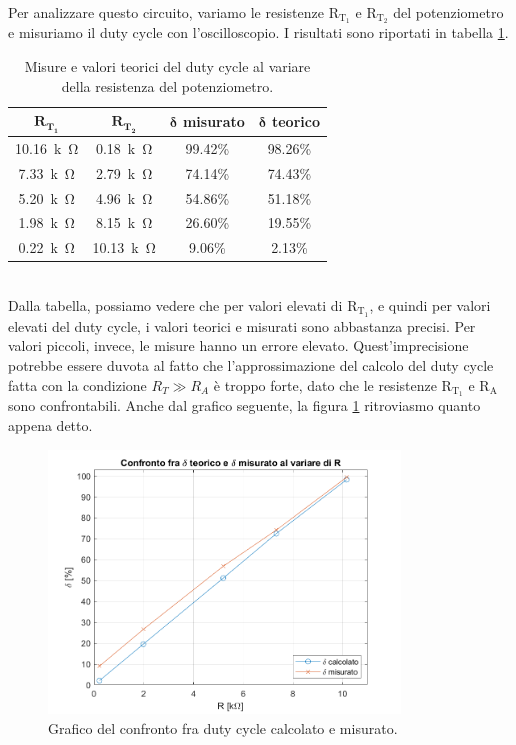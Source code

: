 \documentclass{report}
\begin{document}
\\ Per analizzare questo circuito, variamo le resistenze $\mathrm{R_{T_1}}$ e $\mathrm{R_{T_2}}$ del potenziometro e misuriamo il duty cycle con l'oscilloscopio. I risultati sono riportati in tabella \ref{table:mis_cto4}.
\begin{table}[h!]
	\centering
	\begin{tabular}{|c|c|c|c|}
		\hline
		$\mathbf{R_{T_1}}$ & $\mathbf{R_{T_2}}$ & $\mathbf\delta$\textbf{ misurato} & $\mathbf\delta$\textbf{ teorico}\\ 
		\hline
		\SI{10.16}{k\ohm} & \SI{0.18}{k\ohm} & 99.42\% & 98.26\% \\ 
		\hline
		\SI{7.33}{k\ohm} & \SI{2.79}{k\ohm} & 74.14\% & 74.43\% \\ 
		\hline
		\SI{5.20}{k\ohm} & \SI{4.96}{k\ohm} & 54.86\% & 51.18\% \\ 
		\hline
		\SI{1.98}{k\ohm} & \SI{8.15}{k\ohm} & 26.60\% & 19.55\% \\ 
		\hline
		\SI{0.22}{k\ohm} & \SI{10.13}{k\ohm} & 9.06\% & 2.13\% \\ 
		\hline
	\end{tabular}
	\caption{Misure e valori teorici del duty cycle al variare della resistenza del potenziometro.}
	\label{table:mis_cto4}
\end{table}
\\Dalla tabella, possiamo vedere che per valori elevati di $\mathrm{R_{T_1}}$, e quindi per valori elevati del duty cycle, i valori teorici e misurati sono abbastanza precisi. Per valori piccoli, invece, le misure hanno un errore elevato. Quest'imprecisione potrebbe essere duvota al fatto che l'approssimazione del calcolo del duty cycle fatta con la condizione $\displaystyle{R_{T}\gg R_A}$ è troppo forte, dato che le resistenze $\mathrm{R_{T_1}}$ e $\mathrm{R_{A}}$ sono confrontabili. Anche dal grafico seguente, la figura \ref{figura:grafico4} ritroviasmo quanto appena detto.
\begin{figure}[h!]
	\centering
	\includegraphics[height=7cm]{immagini/graficomis4}
	\caption{Grafico del confronto fra duty cycle calcolato e misurato.}
	\label{figura:grafico4}
\end{figure}
\end{document}
